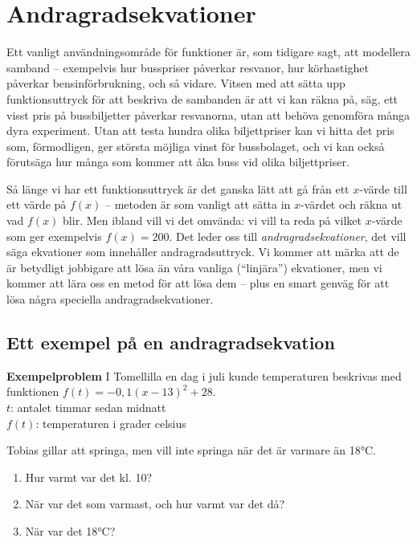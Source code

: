 \section{Andragradsekvationer}

Ett vanligt användningsområde för funktioner är, som tidigare sagt, att modellera samband -- exempelvis hur busspriser påverkar resvanor, hur körhastighet påverkar bensinförbrukning, och så vidare.
Vitsen med att sätta upp funktionsuttryck för att beskriva de sambanden är att vi kan räkna på, säg, ett visst pris på bussbiljetter påverkar resvanorna, utan att behöva genomföra många dyra experiment.
Utan att testa hundra olika biljettpriser kan vi hitta det pris som, förmodligen, ger största möjliga vinst för bussbolaget, och vi kan också förutsäga hur många som kommer att åka buss vid olika biljettpriser.

Så länge vi har ett funktionsuttryck är det ganska lätt att gå från ett $x$-värde till ett värde på $f(x)$ -- metoden är som vanligt att sätta in $x$-värdet och räkna ut vad $f(x)$ blir.
Men ibland vill vi det omvända: vi vill ta reda på vilket $x$-värde som ger exempelvis $f(x)=200$.
Det leder oss till \emph{andragradsekvationer}, det vill säga ekvationer som innehåller andragradsuttryck.
Vi kommer att märka att de är betydligt jobbigare att lösa än våra vanliga (``linjära'') ekvationer, men vi kommer att lära oss en metod för att lösa dem -- plus en smart genväg för att lösa några speciella andragradsekvationer.

\subsection{Ett exempel på en andragradsekvation}

\textbf{Exempelproblem}
I Tomellilla en dag i juli kunde temperaturen beskrivas med funktionen $f(t) = -0,1(x-13)^2+28$. \\
$t$: antalet timmar sedan midnatt \\
$f(t)$: temperaturen i grader celsius

Tobias gillar att springa, men vill inte springa när det är varmare än 18°C.

\begin{enumerate}[label=\Alph*]
  \item Hur varmt var det kl. 10?
  \item När var det som varmast, och hur varmt var det då?
  \item När var det 18°C?
\end{enumerate}

